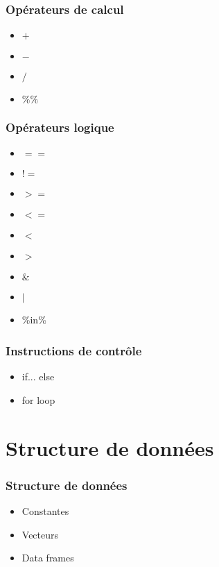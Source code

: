 \documentclass{beamer}
\begin{document}
    \begin{frame}
        \frametitle{Opérateurs de calcul}
        \begin{itemize}
            \item $+$
            \item $-$
            \item $/$
            \item $\%\%$ 
        \end{itemize}
    \end{frame}
    
    \begin{frame}
        \frametitle{Opérateurs logique}
        \begin{itemize}
            \item $==$
            \item $!=$
            \item $>=$
            \item $<=$
            \item $<$
            \item $>$
            \item $\&$
            \item $|$
            \item \%in\%
        \end{itemize}
    \end{frame}
    
    \begin{frame}
        \frametitle{Instructions de contrôle}
        \begin{itemize}
            \item if... else
            \item for loop
        \end{itemize}
    \end{frame}









\section{\R {} Structure de données}

    \begin{frame}
        \frametitle{Structure de données}
        \begin{itemize}
            \item<1-> Constantes
            \item<2-> Vecteurs
            \item<3-> Data frames
        \end{itemize}
    \end{frame}
    
\end{document}
